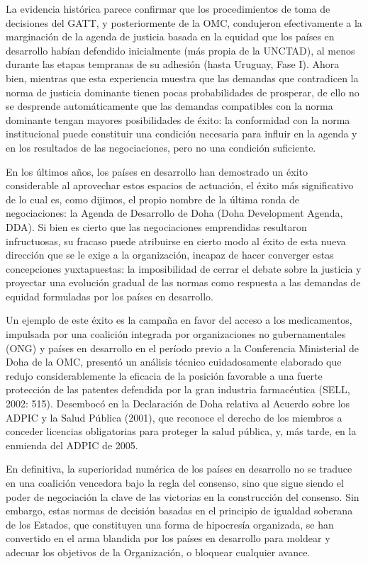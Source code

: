\documentclass[10pt,a4paper]{article}
\begin{document}
La evidencia histórica parece confirmar que los procedimientos de toma de decisiones del GATT, y posteriormente de la OMC, condujeron efectivamente a la marginación de la agenda de justicia basada en la equidad que los países en desarrollo habían defendido inicialmente (más propia de la UNCTAD), al menos durante las etapas tempranas de su adhesión (hasta Uruguay, Fase I). Ahora bien, mientras que esta experiencia muestra que las demandas que contradicen la norma de justicia dominante tienen pocas probabilidades de prosperar, de ello no se desprende automáticamente que las demandas compatibles con la norma dominante tengan mayores posibilidades de éxito: la conformidad con la norma institucional puede constituir una condición necesaria para influir en la agenda y en los resultados de las negociaciones, pero no una condición suficiente.

En los últimos años, los países en desarrollo han demostrado un éxito considerable al aprovechar estos espacios de actuación, el éxito más significativo de lo cual es, como dijimos, el propio nombre de la última ronda de negociaciones: la Agenda de Desarrollo de Doha (Doha Development Agenda, DDA). Si bien es cierto que las negociaciones emprendidas resultaron infructuosas, su fracaso puede atribuirse en cierto modo al éxito de esta nueva dirección que se le exige a la organización, incapaz de hacer converger estas concepciones yuxtapuestas: la imposibilidad de cerrar el debate sobre la justicia y proyectar una evolución gradual de las normas como respuesta a las demandas de equidad formuladas por los países en desarrollo.

Un ejemplo de este éxito es la campaña en favor del acceso a los medicamentos, impulsada por una coalición integrada por organizaciones no gubernamentales (ONG) y países en desarrollo en el período previo a la Conferencia Ministerial de Doha de la OMC, presentó un análisis técnico cuidadosamente elaborado que redujo considerablemente la eficacia de la posición favorable a una fuerte protección de las patentes defendida por la gran industria farmacéutica (SELL, 2002: 515). Desembocó en la Declaración de Doha relativa al Acuerdo sobre los ADPIC y la Salud Pública (2001), que reconoce el derecho de los miembros a conceder licencias obligatorias para proteger la salud pública, y, más tarde, en la enmienda del ADPIC de 2005.

En definitiva, la superioridad numérica de los países en desarrollo no se traduce en una coalición vencedora bajo la regla del consenso, sino que sigue siendo el poder de negociación la clave de las victorias en la construcción del consenso. Sin embargo, estas normas de decisión basadas en el principio de igualdad soberana de los Estados, que constituyen una forma de hipocresía organizada, se han convertido en el arma blandida por los países en desarrollo para moldear y adecuar los objetivos de la Organización, o bloquear cualquier avance. 
\end{document}
